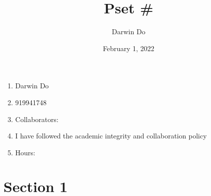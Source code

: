 \documentclass{article}
\title{Pset \#}
\begin{document}
\date{February 1, 2022 }
\author{Darwin Do}

\maketitle

\begin{enumerate}[label=(\alph*)]
    \item Darwin Do
    \item 919941748
    \item Collaborators: 
    \item I have followed the academic integrity and collaboration policy
    \item Hours: 
\end{enumerate}

\newpage

\section{Section 1}
\end{document}
